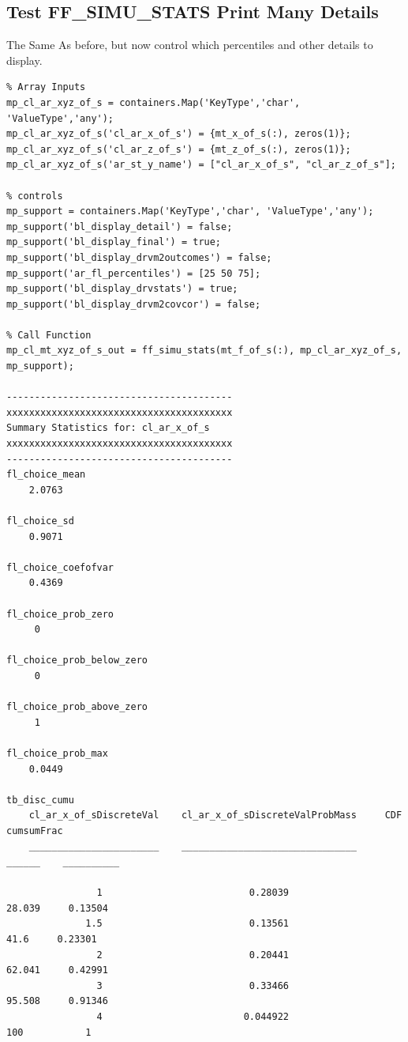 \documentclass[
]{book}
\begin{document}
\hypertarget{test-ff_simu_stats-print-many-details}{%
\subsection{Test FF\_SIMU\_STATS Print Many Details}\label{test-ff_simu_stats-print-many-details}}

The Same As before, but now control which percentiles and other details
to display.

\begin{verbatim}
% Array Inputs
mp_cl_ar_xyz_of_s = containers.Map('KeyType','char', 'ValueType','any');
mp_cl_ar_xyz_of_s('cl_ar_x_of_s') = {mt_x_of_s(:), zeros(1)};
mp_cl_ar_xyz_of_s('cl_ar_z_of_s') = {mt_z_of_s(:), zeros(1)};
mp_cl_ar_xyz_of_s('ar_st_y_name') = ["cl_ar_x_of_s", "cl_ar_z_of_s"];

% controls
mp_support = containers.Map('KeyType','char', 'ValueType','any');
mp_support('bl_display_detail') = false;
mp_support('bl_display_final') = true;
mp_support('bl_display_drvm2outcomes') = false;
mp_support('ar_fl_percentiles') = [25 50 75];
mp_support('bl_display_drvstats') = true;
mp_support('bl_display_drvm2covcor') = false;

% Call Function
mp_cl_mt_xyz_of_s_out = ff_simu_stats(mt_f_of_s(:), mp_cl_ar_xyz_of_s, mp_support);

----------------------------------------
xxxxxxxxxxxxxxxxxxxxxxxxxxxxxxxxxxxxxxxx
Summary Statistics for: cl_ar_x_of_s
xxxxxxxxxxxxxxxxxxxxxxxxxxxxxxxxxxxxxxxx
----------------------------------------
fl_choice_mean
    2.0763

fl_choice_sd
    0.9071

fl_choice_coefofvar
    0.4369

fl_choice_prob_zero
     0

fl_choice_prob_below_zero
     0

fl_choice_prob_above_zero
     1

fl_choice_prob_max
    0.0449

tb_disc_cumu
    cl_ar_x_of_sDiscreteVal    cl_ar_x_of_sDiscreteValProbMass     CDF      cumsumFrac
    _______________________    _______________________________    ______    __________

                1                          0.28039                28.039     0.13504  
              1.5                          0.13561                  41.6     0.23301  
                2                          0.20441                62.041     0.42991  
                3                          0.33466                95.508     0.91346  
                4                         0.044922                   100           1  


\end{verbatim}
\end{document}
